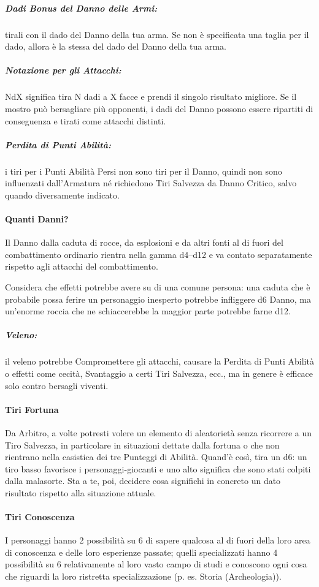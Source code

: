 \documentclass[itdr]{subfiles}
\begin{document}
\subparagraph{Dadi Bonus del Danno delle Armi:} tirali con il dado del Danno della tua arma. Se non è \mbox{specificata} una taglia per il dado, allora è la stessa del dado del Danno della tua arma.

\subparagraph{Notazione per gli Attacchi:} NdX significa tira N dadi a X facce e prendi il singolo risultato migliore. Se il mostro può bersagliare più opponenti, i dadi del Danno possono essere ripartiti di conseguenza e tirati come attacchi distinti.

\subparagraph{Perdita di Punti Abilità:} i tiri per i Punti Abilità Persi non sono tiri per il Danno, quindi non sono influenzati dall’Armatura né richiedono Tiri Salvezza da Danno Critico, salvo quando diversamente indicato. 

\vfill

\paragraph{Quanti Danni?}
Il Danno dalla caduta di rocce, da esplosioni e da altri fonti al di fuori del combattimento ordinario rientra nella gamma d4--d12 e va contato separatamente rispetto agli attacchi del combattimento. 

Considera che effetti potrebbe avere su di una comune persona: una caduta che è probabile possa ferire un personaggio inesperto potrebbe infliggere d6 Danno, ma un’enorme roccia che ne schiaccerebbe la maggior parte potrebbe farne d12. 

\subparagraph{Veleno:} il veleno potrebbe Compromettere gli attacchi, causare la Perdita di Punti Abilità o effetti come cecità, Svantaggio a certi Tiri Salvezza, ecc., ma in genere è efficace solo contro bersagli viventi. 

\vfill

\paragraph{Tiri Fortuna}
Da Arbitro, a volte potresti volere un elemento di aleatorietà senza ricorrere a un Tiro Salvezza, in particolare in situazioni dettate dalla fortuna o che non rientrano nella casistica dei tre Punteggi di Abilità. Quand'è così, tira un d6: un tiro basso favorisce i personaggi-giocanti e uno alto significa che sono stati colpiti dalla malasorte. Sta a te, poi, decidere cosa significhi in concreto un dato risultato rispetto alla situazione attuale.

\vfill

\paragraph{Tiri Conoscenza}
I personaggi hanno 2 possibilità su 6 di sapere qualcosa al di fuori della loro area di conoscenza e delle loro esperienze passate; quelli specializzati hanno 4 possibilità su 6 relativamente al loro vasto campo di studi e conoscono ogni cosa che riguardi la loro ristretta specializzazione (p. es. Storia (Archeologia)).

\vfill
\end{document}

